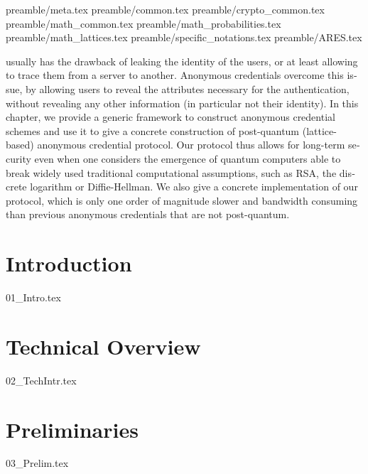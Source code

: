 {
\begin{refsegment}
{preamble/meta.tex}
{preamble/common.tex}
{preamble/crypto_common.tex}
{preamble/math_common.tex}
{preamble/math_probabilities.tex}
{preamble/math_lattices.tex}
{preamble/specific_notations.tex}
{preamble/ARES.tex}


 \label{cha:groupsig}

\begin{english}

 usually has the drawback of 
leaking the identity of the users, or at least allowing to trace them from a 
server to another. Anonymous credentials overcome this issue, by allowing 
users to reveal the attributes necessary for the authentication, without 
revealing any other information (in particular not their identity). In this 
chapter, we provide a generic framework to construct anonymous credential 
schemes and use it to give a concrete construction of post-quantum 
(lattice-based) anonymous credential protocol. Our protocol thus allows for 
long-term security even when one considers the emergence of quantum computers 
able to break widely used traditional computational assumptions, such as RSA, 
the discrete logarithm or Diffie-Hellman. We also give a concrete 
implementation of our protocol, which is only one order of magnitude slower 
and bandwidth consuming than previous anonymous credentials that are not 
post-quantum.

\section{Introduction}\label{sec:introduction}
{01_Intro.tex}

\section{Technical Overview}\label{sec:technical_details}
{02_TechIntr.tex}

\section{Preliminaries}\label{sec:preliminaries}
{03_Prelim.tex}


\end{english}
\end{refsegment}}
